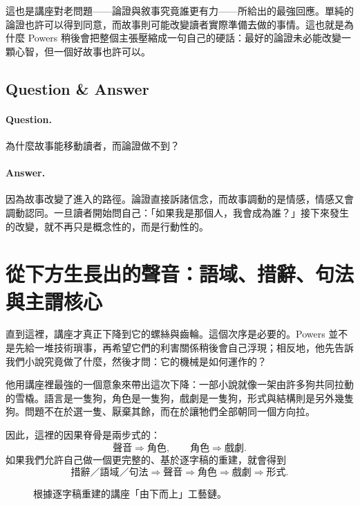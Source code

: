 這也是講座對老問題——論證與敘事究竟誰更有力——所給出的最強回應。單純的論證也許可以得到同意，而故事則可能改變讀者實際準備去做的事情。這也就是為什麼 Powers 稍後會把整個主張壓縮成一句自己的硬話：最好的論證未必能改變一顆心智，但一個好故事也許可以。

\subsection{Question \& Answer}

\paragraph{Question.} 為什麼故事能移動讀者，而論證做不到？

\paragraph{Answer.} 因為故事改變了進入的路徑。論證直接訴諸信念，而故事調動的是情感，情感又會調動認同。一旦讀者開始問自己：「如果我是那個人，我會成為誰？」接下來發生的改變，就不再只是概念性的，而是行動性的。

\section{從下方生長出的聲音：語域、措辭、句法與主謂核心}

直到這裡，講座才真正下降到它的螺絲與齒輪。這個次序是必要的。Powers 並不是先給一堆技術瑣事，再希望它們的利害關係稍後會自己浮現；相反地，他先告訴我們小說究竟做了什麼，然後才問：它的機械是如何運作的？

他用講座裡最強的一個意象來帶出這次下降：一部小說就像一架由許多狗共同拉動的雪橇。語言是一隻狗，角色是一隻狗，戲劇是一隻狗，形式與結構則是另外幾隻狗。問題不在於選一隻、厭棄其餘，而在於讓牠們全部朝同一個方向拉。

因此，這裡的因果脊骨是兩步式的：
\begin{equation}
\text{聲音} \Rightarrow \text{角色},\qquad
\text{角色} \Rightarrow \text{戲劇}.
\end{equation}
如果我們允許自己做一個更完整的、基於逐字稿的重建，就會得到
\begin{equation}
\text{措辭／語域／句法} \Rightarrow \text{聲音} \Rightarrow \text{角色} \Rightarrow \text{戲劇} \Rightarrow \text{形式}.
\end{equation}

\begin{figure}[h]
\centering
{}
\caption{根據逐字稿重建的講座「由下而上」工藝鏈。}
\end{figure}

